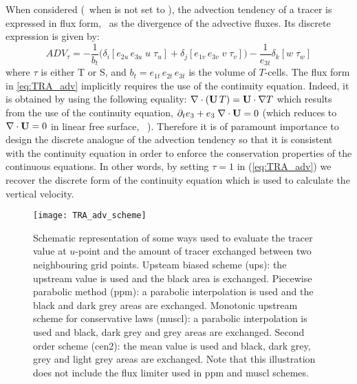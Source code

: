 \documentclass[../main/NEMO_manual]{subfiles}
\begin{document}
When considered (\ie\ when  is not set to ),
the advection tendency of a tracer is expressed in flux form,
\ie\ as the divergence of the advective fluxes.
Its discrete expression is given by:
\begin{equation}
  \label{eq:TRA_adv}
  ADV_\tau = - \frac{1}{b_t} \Big(   \delta_i [ e_{2u} \, e_{3u} \; u \; \tau_u]
                                   + \delta_j [ e_{1v} \, e_{3v} \; v \; \tau_v] \Big)
             - \frac{1}{e_{3t}} \delta_k [w \; \tau_w]
\end{equation}
where $\tau$ is either T or S, and $b_t = e_{1t} \, e_{2t} \, e_{3t}$ is the volume of $T$-cells.
The flux form in \autoref{eq:TRA_adv} implicitly requires the use of the continuity equation.
Indeed, it is obtained by using the following equality:
$\nabla \cdot (\mathbf{U} \, T) = \mathbf{U} \cdot \nabla T$ which
results from the use of the continuity equation,
$\partial_t e_3 + e_3 \; \nabla \cdot \mathbf{U} = 0$
(which reduces to $\nabla \cdot \mathbf{U} = 0$ in linear free surface,
\ie\ ).
Therefore it is of paramount importance to
design the discrete analogue of the advection tendency so that
it is consistent with the continuity equation in order to
enforce the conservation properties of the continuous equations.
In other words, by setting $\tau = 1$ in (\autoref{eq:TRA_adv}) we recover
the discrete form of the continuity equation which is used to calculate the vertical velocity.
\begin{figure}
  \centering
  \texttt{[image: TRA\_adv\_scheme]}
  \caption[Ways to evaluate the tracer value and the amount of tracer exchanged]{
    Schematic representation of some ways used to evaluate the tracer value at $u$-point and
    the amount of tracer exchanged between two neighbouring grid points.
    Upsteam biased scheme (ups):
    the upstream value is used and the black area is exchanged.
    Piecewise parabolic method (ppm):
    a parabolic interpolation is used and the black and dark grey areas are exchanged.
    Monotonic upstream scheme for conservative laws (muscl):
    a parabolic interpolation is used and black, dark grey and grey areas are exchanged.
    Second order scheme (cen2):
    the mean value is used and black, dark grey, grey and light grey areas are exchanged.
    Note that this illustration does not include the flux limiter used in ppm and muscl schemes.}
  \label{fig:TRA_adv_scheme}
\end{figure}
\end{document}
